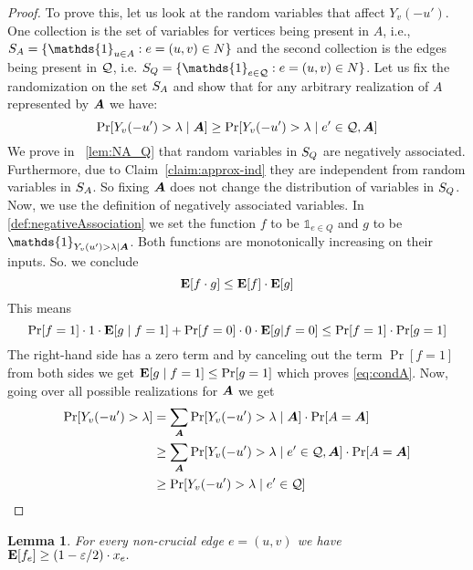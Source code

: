 \documentclass[letterpaper,11pt]{article}
\renewcommand{\epsilon}{\varepsilon}
\DeclareMathOperator{\E}{\ensuremath{\normalfont \textbf{E}}}
\renewcommand{\epsilon}[0]{\ensuremath{\varepsilon}}
\newtheorem{lemma}{Lemma}[section]
\begin{document}
\begin{proof}
    To prove this, let us look at the random variables that affect $Y_v(-u')$. One collection is the set of variables for vertices being present in $A$, i.e., $\rva = \{\mathds{1}_{u \in A} : e = (u, v) \in N  \} $ and the second collection is the edges being present in $\mathcal{Q}$, i.e. $\rvq = \{\mathds{1}_{e \in \qstar} : e = (u, v) \in N \}$.  Let us fix the randomization on the set $S_A$ and show that for any arbitrary realization of  $A$ represented by $\bm{A}$ we have: 
    \begin{equation}\label{eq:condA}
      \Pr[Y_v(-u') > \lambda \mid \bm{A}] \geq \Pr[Y_v(-u') > \lambda \mid e' \in \mathcal{Q}, \bm{A}]
    \end{equation}
We prove in ~\cref{lem:NA_Q} that random variables in $S_Q$ are negatively associated. Furthermore, due to Claim~\ref{claim:approx-ind}  they are independent from random variables in $S_A$. So fixing $\bm{A}$ does not change the distribution of variables in $S_Q$. Now, we use the definition of negatively associated variables. In \cref{def:negativeAssociation} we set the function $f$ to be $\mathds{1}_{e \in Q}$ and $g$ to be $\mathds{1}_{Y_v(u') > \lambda | \Aset}$. Both functions are monotonically increasing on their inputs. So. we  conclude
    $$\E[f \cdot g] \leq \E[f] \cdot \E[g]$$
    This means
    $$\Pr[f = 1] \cdot 1 \cdot \E[g \mid f = 1] + \Pr[f = 0] \cdot 0 \cdot \E[g|f = 0] \leq \Pr[f = 1] \cdot \Pr[g = 1]$$
    The right-hand side has a zero term and by canceling out the term $\Pr[f = 1]$ from both sides we get 
    $\E[g \mid f = 1] \leq \Pr[g = 1]$ which proves \eqref{eq:condA}. Now, going over all possible realizations for $\bm{A}$ we get
    \begin{align*}
        \Pr[Y_v(-u') > \lambda] &= \sum_{\bm{A}}  \Pr[Y_v(-u') > \lambda \mid \bm{A}] \cdot \Pr[A = \bm{A}] \\
        & \geq \sum_{\bm{A}} \Pr[Y_v(-u') > \lambda \mid e' \in \mathcal{Q}, \bm{A}] \cdot \Pr[A = \bm{A}] \\
        & \geq \Pr[Y_v(-u') > \lambda \mid e' \in \mathcal{Q}]
    \end{align*} \qedhere
\end{proof}


\begin{lemma}\label{lemma:expweight}
For every non-crucial edge $e = (u, v)$ we have $\E[f_e] \geq (1 - \epsilon/2) \cdot x_e.$   
\end{lemma}
\end{document}
